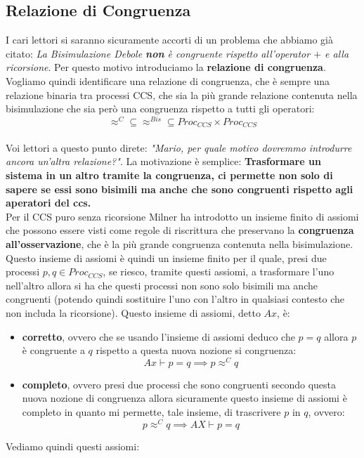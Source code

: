 \subsection{Relazione di Congruenza}
I cari lettori si saranno sicuramente accorti di un problema che abbiamo già citato: \textit{La Bisimulazione Debole \textbf{non} è congruente rispetto all'operator $+$ e alla ricorsione}. Per questo motivo introduciamo la \textbf{relazione di congruenza}.
Vogliamo quindi identificare una relazione di congruenza, che è sempre una
relazione binaria tra processi CCS, che sia la più grande relazione contenuta
nella bisimulazione che sia però una congruenza rispetto a tutti gli
operatori:
\[\approx^C\subseteq\approx^{Bis}\subseteq Proc_{CCS}\times Proc_{CCS}\]\\
Voi lettori a questo punto direte: \textit{"Mario, per quale motivo dovremmo introdurre ancora un'altra relazione?"}. La motivazione è semplice: \textbf{Trasformare un sistema in un altro tramite la congruenza, ci permette non solo di sapere se essi sono bisimili ma anche che sono congruenti rispetto agli aperatori del ccs.}\\
Per il CCS puro senza ricorsione Milner ha introdotto un insieme
finito di assiomi che possono essere visti come regole di riscrittura che
preservano la \textbf{congruenza all'osservazione}, che è la più grande
congruenza contenuta nella bisimulazione. Questo insieme di assiomi è quindi un
insieme finito per il quale, presi due processi $p, q\in Proc_{CCS}$, se riesco,
tramite questi assiomi, a trasformare l'uno nell'altro allora si ha che questi
processi non sono solo bisimili ma anche congruenti (potendo quindi sostituire
l'uno con l'altro in qualsiasi contesto che non includa la ricorsione). Questo
insieme di assiomi, detto $Ax$, è:
\begin{itemize}
  \item \textbf{corretto}, ovvero che se usando l'insieme di assiomi deduco che
  $p=q$ allora $p$ è congruente a $q$ rispetto a questa nuova nozione si
  congruenza:
  \[Ax\vdash p=q\implies p\approx^C q\]
  \item \textbf{completo}, ovvero presi due processi che sono congruenti secondo
  questa nuova nozione di congruenza allora sicuramente questo insieme di
  assiomi è completo in quanto mi permette, tale insieme, di trascrivere $p$ in
  $q$, ovvero:
  \[p\approx^C q\implies AX\vdash p=q\]
\end{itemize}
Vediamo quindi questi assiomi:
